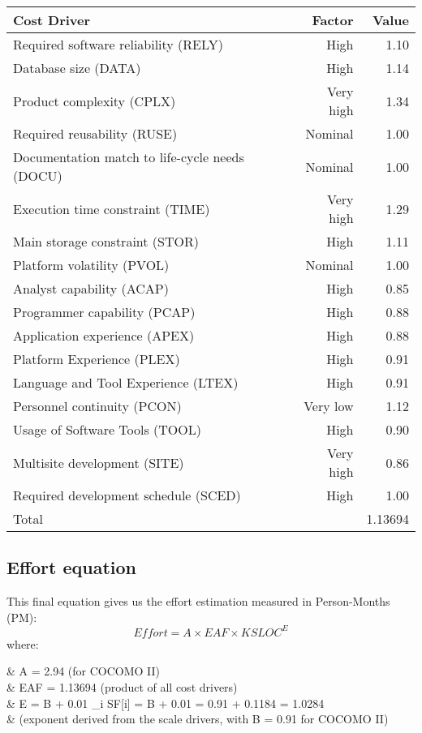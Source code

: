 \begin{table}[H]
	\centering
	\begin{tabular}{|l|r|r|}
		\hline
		Cost Driver & Factor & Value \\
		\hline
		Required software reliability (RELY) & High & 1.10
\\
		Database size (DATA) & High & 1.14 \\
		Product complexity (CPLX) & Very high & 1.34
\\
		Required reusability (RUSE) & Nominal & 1.00
\\
		Documentation match to life-cycle needs (DOCU) & Nominal & 1.00
\\
		Execution time constraint (TIME) & Very high & 1.29
\\
		Main storage constraint (STOR) & High & 1.11
\\
		Platform volatility (PVOL) & Nominal & 1.00
\\
		Analyst capability (ACAP) & High & 0.85
\\
		Programmer capability (PCAP) & High & 0.88
\\
		Application experience (APEX) & High & 0.88 \\
		Platform Experience (PLEX) & High & 0.91
\\
		Language and Tool Experience (LTEX) & High & 0.91
\\
		Personnel continuity (PCON) & Very low & 1.12
\\
		Usage of Software Tools (TOOL) & High & 0.90
\\
		Multisite development (SITE) & Very high & 0.86
\\
		Required development schedule (SCED) & High & 1.00 \\
		\hline
		\multicolumn{2}{|l|}{Total} & 1.13694 \\
		\hline	
	\end{tabular}
\end{table}

\subsection{Effort equation}
This final equation gives us the effort estimation measured in Person-Months (PM):
\[ Effort = A \times EAF \times KSLOC^E \]
where:
\begin{nospaceflalign*}
	& A = 2.94 \textnormal{ (for COCOMO II)} \phantom{\sum} \\
	& EAF = 1.13694 \textnormal{ (product of all cost drivers)} \\
	& E = B + 0.01 \times \sum_{i} SF[i] = B + 0.01  = 0.91 + 0.1184 = 1.0284 \\
	& \textnormal{(exponent derived from the scale drivers, with B = 0.91 for COCOMO II)} \\
\end{nospaceflalign*}

